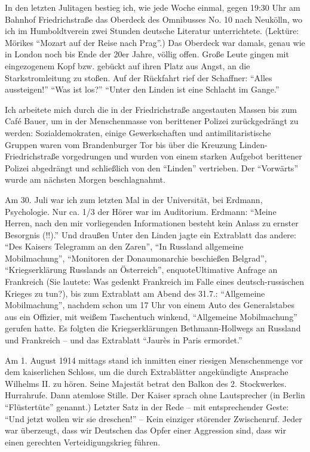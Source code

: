 \documentclass[a5paper,pagesize,10pt,twoside=true]{scrbook}
\begin{document}
In den letzten Julitagen bestieg ich, wie jede Woche einmal, gegen 19:30 Uhr am Bahnhof Friedrichstraße das Oberdeck des Omnibusses No. 10 nach Neukölln, wo ich im Humboldtverein zwei Stunden deutsche Literatur unterrichtete. (Lektüre: Mörikes \enquote{Mozart auf der Reise nach Prag}.) Das Oberdeck war damals, genau wie in London noch bis Ende der 20er Jahre, völlig offen. Große Leute gingen mit eingezogenem Kopf bzw. gebückt auf ihren Platz aus Angst, an die Starkstromleitung zu stoßen. Auf der Rückfahrt rief der Schaffner: \enquote{Alles aussteigen!} \enquote{Was ist los?} \enquote{Unter den Linden ist eine Schlacht im Gange.}

Ich arbeitete mich durch die in der Friedrichstraße angestauten Massen bis zum Café Bauer, um in der Menschenmasse von berittener Polizei zurückgedrängt zu werden: Sozialdemokraten, einige Gewerkschaften und antimilitaristische Gruppen waren vom Brandenburger Tor bis über die Kreuzung Linden-Friedrichstraße vorgedrungen und wurden von einem starken Aufgebot berittener Polizei abgedrängt und schließlich von den \enquote{Linden} vertrieben. Der \enquote{Vorwärts} wurde am nächsten Morgen beschlagnahmt.

Am 30. Juli war ich zum letzten Mal in der Universität, bei Erdmann, Psychologie. Nur ca. 1/3 der Hörer war im Auditorium. Erdmann: \enquote{Meine Herren, nach den mir vorliegenden Informationen besteht kein Anlass zu ernster Besorgnis (!!).} Und draußen Unter den Linden jagte ein Extrablatt das andere: \enquote{Des Kaisers Telegramm an den Zaren}, \enquote{In Russland allgemeine Mobilmachung}, \enquote{Monitoren der Donaumonarchie beschießen Belgrad}, \enquote{Kriegserklärung Russlands an Österreich}, enquote{Ultimative Anfrage an Frankreich} (Sie lautete: Was gedenkt Frankreich im Falle eines deutsch-russischen Krieges zu tun?), bis zum Extrablatt am Abend des 31.7.: \enquote{Allgemeine Mobilmachung}, nachdem schon um 17 Uhr von einem Auto des Generalstabes aus ein Offizier, mit weißem Taschentuch winkend, \enquote{Allgemeine Mobilmachung} gerufen hatte. Es folgten die Kriegserklärungen Bethmann-Hollwegs an Russland und Frankreich -- und das Extrablatt \enquote{Jaurès in Paris ermordet.}

Am 1. August 1914 mittags stand ich inmitten einer riesigen Menschenmenge vor dem kaiserlichen Schloss, um die durch Extrablätter angekündigte Ansprache Wilhelms II. zu hören. Seine Majestät betrat den Balkon des 2. Stockwerkes. Hurrahrufe. Dann atemlose Stille. Der Kaiser sprach ohne Lautsprecher (in Berlin \enquote{Flüstertüte} genannt.) Letzter Satz in der Rede -- mit entsprechender Geste: \enquote{Und jetzt wollen wir sie dreschen!} -- Kein einziger störender Zwischenruf. Jeder war überzeugt, dass wir Deutschen das Opfer einer Aggression sind, dass wir einen gerechten Verteidigungskrieg führen.
\end{document}
